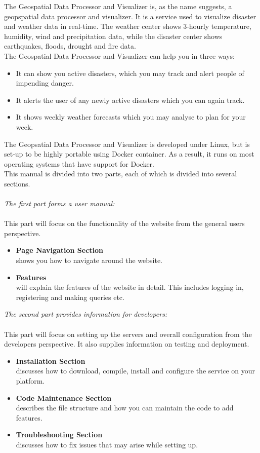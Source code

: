 The Geospatial Data Processor and Visualizer is, as the name suggests, a geopspatial data processor and visualizer. It is a service used to visualize disaster and weather data in real-time. The weather center shows 3-hourly temperature, humidity, wind and precipitation data, while the disaster center shows earthquakes, floods, drought and fire data.\\

The Geospatial Data Processor and Visualizer can help you in three ways: 

\begin{itemize}
	\item It can show you active disasters, which you may track and alert people of impending danger.
	\item It alerts the user of any newly active disasters which you can again track. 
	\item It shows weekly weather forecasts which you may analyse to plan for your week.
\end{itemize}
The Geopsatial Data Processor and Visualizer is developed under Linux, but is set-up to be highly portable using Docker container. As a result, it runs on most operating systems that have support for Docker.\\
This manual is divided into two parts, each of which is divided into several sections.\\ \\
\emph{The first part forms a user manual:}\\ \\
This part will focus on the functionality of the website from the general users perspective.
\begin{itemize}%
	\item \textbf{Page Navigation Section}\\ shows you how to navigate around the website.
	\item \textbf{Features}\\ will explain the features of the website in detail. This includes logging in, registering and making queries etc.
\end{itemize}
\emph{The second part provides information for developers:}\\ \\
This part will focus on setting up the servers and overall configuration from the developers perspective. It also supplies information on testing and deployment.
\begin{itemize}%
	\item \textbf{Installation Section}\\ discusses how to download, compile, install and configure the service on your platform.
	\item \textbf{Code Maintenance Section}\\ describes the file structure and how you can maintain the code to add features.
	\item \textbf{Troubleshooting Section}\\ discusses how to fix issues that may arise while setting up.
\end{itemize}